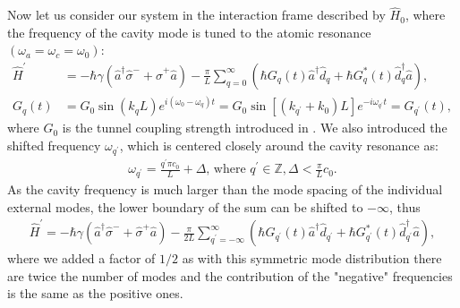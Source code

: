 \documentclass[11pt, a4paper]{article}
\def\aop{\hat{a}}
\def\adop{\hat{a}^\dagger}
\def\dop{\hat{d}}
\def\ddop{\hat{d}^\dagger}
\def\sigop{\hat{\sigma}^-}
\def\sigdop{\hat{\sigma}^+}
\def\Hop{\hat{H}}
\def\Hpop{\hat{H}^\prime}
\def\qp{{q^\prime}}
\def\nn{\nonumber}
\newcommand{\lsz}{\left[}
\newcommand{\rsz}{\right]}
\newcommand{\lk}{\left(}
\newcommand{\rk}{\right)}
\begin{document}
Now let us consider our system in the interaction frame described by $\Hop_0$, where the frequency of the cavity mode is tuned to the atomic resonance $\lk \omega_a=\omega_c=\omega_0\rk$:
\begin{align}
\Hpop &= -\hbar\gamma\lk\adop\sigop + \sigdop\aop\rk - \frac{\pi}{L}\sum_{q=0}^\infty\lk\hbar G_q(t)\adop\dop_q + \hbar G^*_q(t)\ddop_q\aop\rk,\nn\\
G_q(t) &= G_0\sin{(k_qL)}e^{i(\omega_0-\omega_q)t} = G_0\sin{\lsz(k_\qp+k_0)L\rsz}e^{-i\omega_\qp t} = G_\qp(t),
\end{align}
where $G_0$ is the tunnel coupling strength introduced in \cite{Kabuss2015}. We also introduced the shifted frequency $\omega_\qp$, which is centered closely around the cavity resonance as:
\begin{align}
\label{omega_qp_def}
\omega_\qp = \frac{\qp\pi c_0}{L}+\Delta \text{, where } \qp\in\mathbb{Z}, \Delta<\frac{\pi}{L}c_0.
\end{align}
As the cavity frequency is much larger than the mode spacing of the individual external modes, the lower boundary of the sum can be shifted to $-\infty$, thus
\begin{align}
\Hpop = -\hbar\gamma\lk\adop\sigop + \sigdop\aop\rk - \frac{\pi}{2L}\sum_{\qp=-\infty}^\infty\lk\hbar G_{\qp}(t)\adop\dop_{\qp} + \hbar G^*_{\qp}(t)\ddop_{\qp}\aop\rk,
\end{align}
where we added a factor of $1/2$ as with this symmetric mode distribution there are twice the number of modes and the contribution of the "negative" frequencies is the same as the positive ones.
\end{document}
